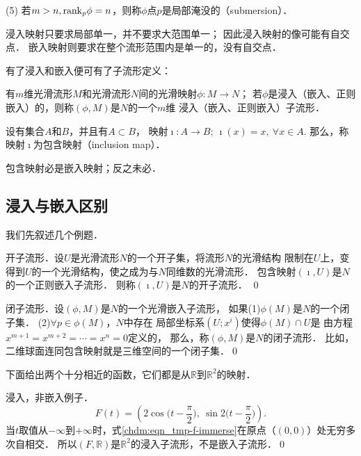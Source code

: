 (5) 若$m> n, {\rm rank}_p\phi=n$，则称$\phi$点$p$是{\heiti 局部淹没}的（submersion）．


浸入映射只要求局部单一，并不要求大范围单一；
因此浸入映射的像可能有自交点．
嵌入映射则要求在整个流形范围内是单一的，没有自交点．


有了浸入和嵌入便可有了子流形定义：
\begin{definition}
    有$m$维光滑流形$M$和光滑流形$N$间的光滑映射$\phi:M\to N$；
    若$\phi$是浸入（嵌入、正则嵌入）的，则称$(\phi,M)$是$N$的一个$m$维
    {\heiti 浸入（嵌入、正则嵌入）子流形}．
\end{definition}


\begin{definition}\label{chdm:def_inclusion-map}
    设有集合$A$和$B$，并且有$A\subset B$，
    映射$\imath: A\to B;\ \imath(x) = x, \ \forall x\in A. $
    那么，称映射$\imath$为{\heiti 包含映射}（inclusion map）．
\end{definition}
包含映射必是嵌入映射；反之未必．

\subsection{浸入与嵌入区别}
我们先叙述几个例题．
\begin{example}\label{chdm:exm_opensub}
    {\heiti 开子流形}．设$U$是光滑流形$N$的一个开子集，将流形$N$的光滑结构
    限制在$U$上，变得到$U$的一个光滑结构，使之成为与$N$同维数的光滑流形．
    包含映射$(\imath,U)$是$N$的一个正则嵌入子流形．
    则称$(\imath,U)$是$N$的开子流形． \qed
\end{example}

\begin{example}\label{chdm:exm_closesub}
    {\heiti 闭子流形}．设$(\phi,M)$是$N$的一个光滑嵌入子流形，
    如果(1)$\phi(M)$是$N$的一个闭子集． (2)$\forall p\in \phi(M)$，$N$中存在
    局部坐标系$(U;x^i)$使得$\phi(M)\cap U$是
    由方程$x^{m+1}=x^{m+2}=\cdots=x^n=0$定义的，
    那么，称$(\phi,M)$是$N$的闭子流形．
    比如，二维球面连同包含映射就是三维空间的一个闭子集．\qed
\end{example}


下面给出两个十分相近的函数，它们都是从$\mathbb{R}$到$\mathbb{R}^2$的映射．
\begin{example}\label{chdm:exm_iec1}
    浸入，非嵌入例子．  
    \begin{equation}\label{chdm:eqn_tmp-f-immerse}
        F(t)=\left(2\cos\Big(t-\frac{\pi}{2}\Big),\ \sin2\Big(t-\frac{\pi}{2}\Big) \right) .
    \end{equation}
    当$t$取值从$-\infty$到$+\infty$时，式\eqref{chdm:eqn_tmp-f-immerse}在原点（$(0,0)$）处无穷多次自相交．
    所以$(F,\mathbb{R})$是$\mathbb{R}^2$的浸入子流形，不是嵌入子流形．\qed  
\end{example}

